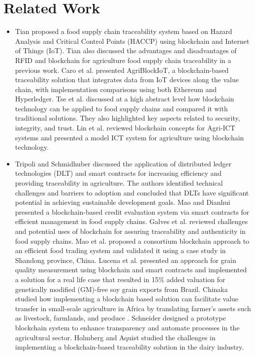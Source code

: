 \section{Related Work}
\begin{itemize}
    \item Tian proposed a food supply chain traceability system 
    based on Hazard Analysis and Critical Control Points 
    (HACCP) using blockchain and Internet of Things (IoT). 
    Tian also discussed the advantages and disadvantages of 
    RFID and blockchain for agriculture food supply chain 
    traceability in a previous work. Caro et al. presented 
    AgriBlockIoT, a blockchain-based traceability solution 
    that integrates data from IoT devices along the value 
    chain, with implementation comparisons using both 
    Ethereum and Hyperledger. Tse et al. discussed at a high 
    abstract level how blockchain technology can be applied 
    to food supply chains and compared it with traditional 
    solutions. They also highlighted key aspects related to 
    security, integrity, and trust. Lin et al. reviewed 
    blockchain concepts for Agri-ICT systems and presented 
    a model ICT system for agriculture using blockchain 
    technology.
    
    \item Tripoli and Schmidhuber discussed the application of 
    distributed ledger technologies (DLT) and smart 
    contracts for increasing efficiency and providing 
    traceability in agriculture. The authors identified 
    technical challenges and barriers to adoption and 
    concluded that DLTs have significant potential in 
    achieving sustainable development goals. Mao and 
    Dianhui presented a blockchain-based credit evaluation 
    system via smart contracts for efficient management in 
    food supply chains. Galves et al. reviewed challenges and 
    potential uses of blockchain for assuring traceability and 
    authenticity in food supply chains. Mao et al. proposed a 
    consortium blockchain approach to an efficient food 
    trading system and validated it using a case study in 
    Shandong province, China. Lucena et al. presented an 
    approach for grain quality measurement using blockchain 
    and smart contracts and implemented a solution for a real life case that resulted in 15\% added valuation for 
    genetically modified (GM)-free soy grain exports from 
    Brazil. Chinaka studied how implementing a blockchain based solution can facilitate value transfer in small-scale 
    agriculture in Africa by translating farmer's assets such as 
    livestock, farmlands, and produce . Schneider designed a 
    prototype blockchain system to enhance transparency and 
    automate processes in the agricultural sector. Holmberg 
    and Aquist studied the challenges in implementing a 
    blockchain-based traceability solution in the dairy 
    industry.
    

\end{itemize}
